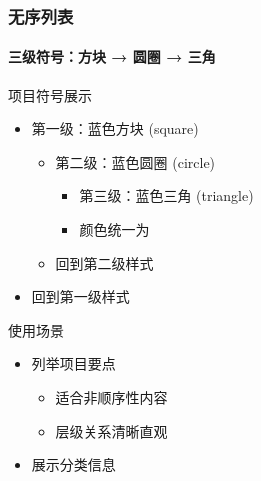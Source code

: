 \begin{frame}
\frametitle{无序列表}
\framesubtitle{三级符号：方块 → 圆圈 → 三角}

\begin{block}{项目符号展示}
\begin{itemize}
  \item 第一级：蓝色方块 (square)
  \begin{itemize}
    \item 第二级：蓝色圆圈 (circle)
    \begin{itemize}
      \item 第三级：蓝色三角 (triangle)
      \item 颜色统一为 
    \end{itemize}
    \item 回到第二级样式
  \end{itemize}
  \item 回到第一级样式
\end{itemize}
\end{block}

\begin{exampleblock}{使用场景}
\begin{itemize}
  \item 列举项目要点
  \begin{itemize}
    \item 适合非顺序性内容
    \item 层级关系清晰直观
  \end{itemize}
  \item 展示分类信息
\end{itemize}
\end{exampleblock}
\end{frame}
